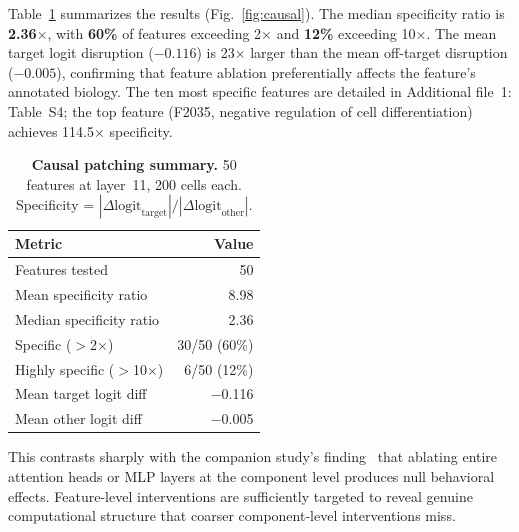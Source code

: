 \documentclass[onecolumn]{article}
\begin{document}
Table~\ref{tab:causal_summary} summarizes the results (Fig.~\ref{fig:causal}). The median specificity ratio is \textbf{2.36$\times$}, with \textbf{60\%} of features exceeding 2$\times$ and \textbf{12\%} exceeding 10$\times$. The mean target logit disruption ($-0.116$) is 23$\times$ larger than the mean off-target disruption ($-0.005$), confirming that feature ablation preferentially affects the feature's annotated biology. The ten most specific features are detailed in Additional file~1: Table~S4; the top feature (F2035, negative regulation of cell differentiation) achieves 114.5$\times$ specificity.

\begin{table}[t]
\centering
\caption{\textbf{Causal patching summary.} 50 features at layer~11, 200 cells each. Specificity = $|\Delta\text{logit}_\text{target}| / |\Delta\text{logit}_\text{other}|$.}
\label{tab:causal_summary}
\smallskip
\begin{tabular}{lr}
\toprule
Metric & Value \\
\midrule
Features tested & 50 \\
Mean specificity ratio & 8.98 \\
Median specificity ratio & 2.36 \\
Specific ($>$2$\times$) & 30/50 (60\%) \\
Highly specific ($>$10$\times$) & 6/50 (12\%) \\
Mean target logit diff & $-$0.116 \\
Mean other logit diff & $-$0.005 \\
\bottomrule
\end{tabular}
\end{table}

This contrasts sharply with the companion study's finding~\cite{kendiukhov2025systematic} that ablating entire attention heads or MLP layers at the component level produces null behavioral effects. Feature-level interventions are sufficiently targeted to reveal genuine computational structure that coarser component-level interventions miss.
\end{document}
